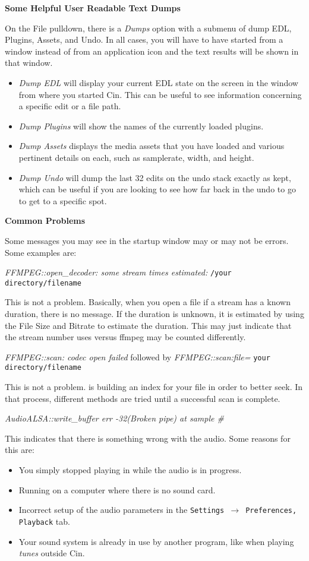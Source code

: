 \textbf{Some Helpful User Readable Text Dumps}

On the File pulldown, there is a \textit{Dumps} option with a submenu of dump EDL, Plugins, Assets, and Undo. In all cases, you will have to have started \CGG{} from a window instead of from an application icon and
the text results will be shown in that window.

\begin{itemize}[nosep]
\item \textit{Dump EDL} will display your current EDL state on the screen in the window from where you started Cin. This can be useful to see information concerning a specific edit or a file path.
\item \textit{Dump Plugins} will show the names of the currently loaded plugins.
\item \textit{Dump Assets} displays the media assets that you have loaded and various pertinent details on each, such as samplerate, width, and height.
\item \textit{Dump Undo }will dump the last 32 edits on the undo stack exactly as kept, which can be useful if you are looking to see how far back in the undo to go to get to a specific spot.
\end{itemize}

\textbf{Common Problems}

Some messages you may see in the startup window may or may not be errors. Some examples are:
\bigskip

\textit{FFMPEG::open\_decoder: some stream times estimated:} \quad \texttt{/your directory/filename}

This is not a problem. Basically, when you open a file if a stream has a known duration, there is no message. If the duration is unknown, it is estimated by using the File Size and Bitrate to estimate the duration. This may just indicate that the stream number \CGG{} uses versus ffmpeg may be counted differently.
\bigskip

\textit{FFMPEG::scan: codec open failed} followed by
\newline 
\textit{FFMPEG::scan:file=} \quad \texttt{your directory/filename}

This is not a problem. \CGG{} is building an index for your file in order to better seek.  In that process, different methods are tried until a successful scan is complete.
\bigskip

\textit{AudioALSA::write\_buffer err -32(Broken pipe) at sample \#}

This indicates that there is something wrong with the audio. Some reasons for this are:
\begin{itemize}[nosep]
	\item You simply stopped playing in \CGG{} while the audio is in progress.
	\item Running on a computer where there is no sound card.
	\item Incorrect setup of the audio parameters in the \texttt{Settings $\rightarrow$ Preferences, Playback} tab.
	\item Your sound system is already in use by another program, like when playing \textit{tunes} outside Cin.
\end{itemize}
\bigskip


